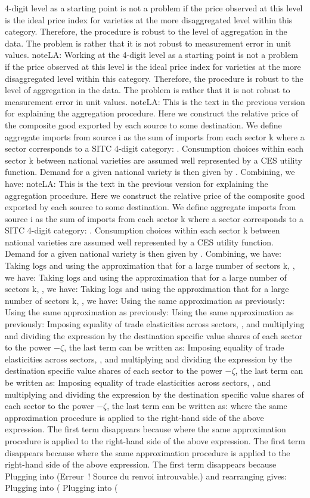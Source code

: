 \documentclass[12pt,twoside,a4paper,notitlepage]{article}
\begin{document}
4-digit level as a starting point is not a problem if the price observed at this level is the ideal price index for varieties at the more disaggregated level within this category. Therefore, the procedure is robust to the level of aggregation in the data. The problem is rather that it is not robust to measurement error in unit values. noteLA: Working at the 4-digit level as a starting point is not a problem if the price observed at this level is the ideal price index for varieties at the more disaggregated level within this category. Therefore, the procedure is robust to the level of aggregation in the data. The problem is rather that it is not robust to measurement error in unit values. noteLA: This is the text in the previous version for explaining the aggregation procedure. Here we construct the relative price of the composite good exported by each source to some destination. We define aggregate imports from source i as the sum of imports from each sector k where a sector corresponds to a SITC 4-digit category: . Consumption choices within each sector k between national varieties are assumed well represented by a CES utility function. Demand for a given national variety is then given by . Combining, we have: noteLA: This is the text in the previous version for explaining the aggregation procedure. Here we construct the relative price of the composite good exported by each source to some destination. We define aggregate imports from source i as the sum of imports from each sector k where a sector corresponds to a SITC 4-digit category: . Consumption choices within each sector k between national varieties are assumed well represented by a CES utility function. Demand for a given national variety is then given by . Combining, we have: Taking logs and using the approximation that for a large number of sectors k, , we have: Taking logs and using the approximation that for a large number of sectors k, , we have: Taking logs and using the approximation that for a large number of sectors k, , we have: Using the same approximation as previously: Using the same approximation as previously: Using the same approximation as previously: Imposing equality of trade elasticities across sectors, , and multiplying and dividing the expression by the destination specific value shares of each sector to the power ${-}$${\zeta}$, the last term can be written as: Imposing equality of trade elasticities across sectors, , and multiplying and dividing the expression by the destination specific value shares of each sector to the power ${-}$${\zeta}$, the last term can be written as: Imposing equality of trade elasticities across sectors, , and multiplying and dividing the expression by the destination specific value shares of each sector to the power ${-}$${\zeta}$, the last term can be written as: where the same approximation procedure is applied to the right-hand side of the above expression. The first term disappears because where the same approximation procedure is applied to the right-hand side of the above expression. The first term disappears because where the same approximation procedure is applied to the right-hand side of the above expression. The first term disappears because Plugging into (Erreur~! Source du renvoi introuvable.) and rearranging gives: Plugging into ( Plugging into ( 
\end{document}

